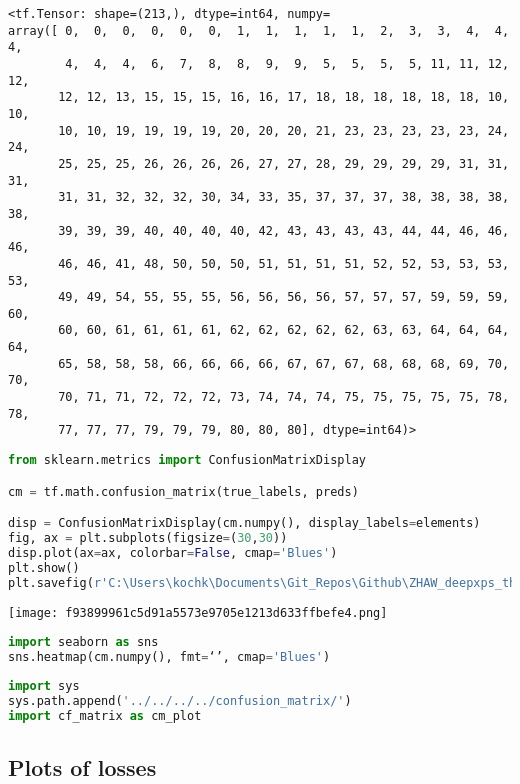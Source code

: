 \begin{lstlisting}
<tf.Tensor: shape=(213,), dtype=int64, numpy=
array([ 0,  0,  0,  0,  0,  0,  1,  1,  1,  1,  1,  2,  3,  3,  4,  4,  4,
        4,  4,  4,  6,  7,  8,  8,  9,  9,  5,  5,  5,  5, 11, 11, 12, 12,
       12, 12, 13, 15, 15, 15, 16, 16, 17, 18, 18, 18, 18, 18, 18, 10, 10,
       10, 10, 19, 19, 19, 19, 20, 20, 20, 21, 23, 23, 23, 23, 23, 24, 24,
       25, 25, 25, 26, 26, 26, 26, 27, 27, 28, 29, 29, 29, 29, 31, 31, 31,
       31, 31, 32, 32, 32, 30, 34, 33, 35, 37, 37, 37, 38, 38, 38, 38, 38,
       39, 39, 39, 40, 40, 40, 40, 42, 43, 43, 43, 43, 44, 44, 46, 46, 46,
       46, 46, 41, 48, 50, 50, 50, 51, 51, 51, 51, 52, 52, 53, 53, 53, 53,
       49, 49, 54, 55, 55, 55, 56, 56, 56, 56, 57, 57, 57, 59, 59, 59, 60,
       60, 60, 61, 61, 61, 61, 62, 62, 62, 62, 62, 63, 63, 64, 64, 64, 64,
       65, 58, 58, 58, 66, 66, 66, 66, 67, 67, 67, 68, 68, 68, 69, 70, 70,
       70, 71, 71, 72, 72, 72, 73, 74, 74, 74, 75, 75, 75, 75, 75, 78, 78,
       77, 77, 77, 79, 79, 79, 80, 80, 80], dtype=int64)>
\end{lstlisting}

\begin{lstlisting}[language=Python]
from sklearn.metrics import ConfusionMatrixDisplay

cm = tf.math.confusion_matrix(true_labels, preds)

disp = ConfusionMatrixDisplay(cm.numpy(), display_labels=elements)
fig, ax = plt.subplots(figsize=(30,30))
disp.plot(ax=ax, colorbar=False, cmap='Blues')
plt.show()
plt.savefig(r'C:\Users\kochk\Documents\Git_Repos\Github\ZHAW_deepxps_thesis\Figures\best_task_1_model_CM.png', dpi=300)
\end{lstlisting}

\texttt{[image: f93899961c5d91a5573e9705e1213d633ffbefe4.png]}

\begin{lstlisting}[language=Python]
import seaborn as sns
sns.heatmap(cm.numpy(), fmt=‘’, cmap='Blues')
\end{lstlisting}

\begin{lstlisting}[language=Python]
import sys
sys.path.append('../../../../confusion_matrix/')
import cf_matrix as cm_plot
\end{lstlisting}

\hypertarget{plots-of-losses}{%
\subsection*{Plots of losses}\label{plots-of-losses}}

